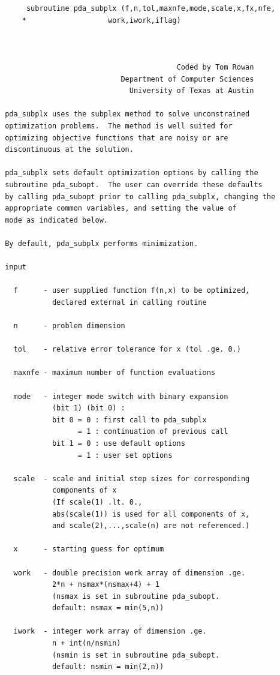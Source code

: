 \documentclass[11pt,twoside]{article}
\begin{document}
\begin{verbatim}
      subroutine pda_subplx (f,n,tol,maxnfe,mode,scale,x,fx,nfe,
     *                   work,iwork,iflag)



                                         Coded by Tom Rowan
                            Department of Computer Sciences
                              University of Texas at Austin

 pda_subplx uses the subplex method to solve unconstrained
 optimization problems.  The method is well suited for
 optimizing objective functions that are noisy or are
 discontinuous at the solution.

 pda_subplx sets default optimization options by calling the
 subroutine pda_subopt.  The user can override these defaults
 by calling pda_subopt prior to calling pda_subplx, changing the
 appropriate common variables, and setting the value of
 mode as indicated below.

 By default, pda_subplx performs minimization.

 input

   f      - user supplied function f(n,x) to be optimized,
            declared external in calling routine

   n      - problem dimension

   tol    - relative error tolerance for x (tol .ge. 0.)

   maxnfe - maximum number of function evaluations

   mode   - integer mode switch with binary expansion
            (bit 1) (bit 0) :
            bit 0 = 0 : first call to pda_subplx
                  = 1 : continuation of previous call
            bit 1 = 0 : use default options
                  = 1 : user set options

   scale  - scale and initial step sizes for corresponding
            components of x
            (If scale(1) .lt. 0.,
            abs(scale(1)) is used for all components of x,
            and scale(2),...,scale(n) are not referenced.)

   x      - starting guess for optimum

   work   - double precision work array of dimension .ge.
            2*n + nsmax*(nsmax+4) + 1
            (nsmax is set in subroutine pda_subopt.
            default: nsmax = min(5,n))

   iwork  - integer work array of dimension .ge.
            n + int(n/nsmin)
            (nsmin is set in subroutine pda_subopt.
            default: nsmin = min(2,n))


\end{verbatim}
\end{document}
